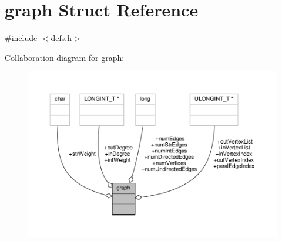 \hypertarget{structgraph}{\section{graph Struct Reference}
\label{structgraph}
}


{\ttfamily \#include $<$defs.\-h$>$}



Collaboration diagram for graph\-:
\nopagebreak
\begin{figure}[H]
\begin{center}
\leavevmode
\includegraphics[width=350pt]{structgraph__coll__graph}
\end{center}
\end{figure}

